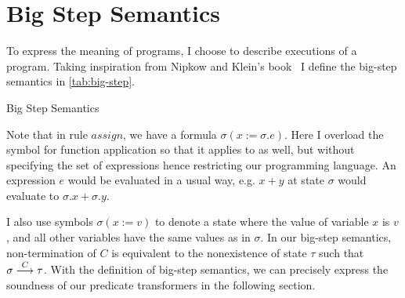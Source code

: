 \section{Big Step Semantics}\label{sec:big-step}
To express the meaning of programs, I choose  to describe executions of a program. 
Taking inspiration from Nipkow and Klein's book~\cite{nipkow2014} I define the big-step semantics in \autoref{tab:big-step}. 

\newcommand\ddfrac[2]{\frac{\displaystyle #1}{\displaystyle #2}}
\begin{table}[t]
  \normalsize
  \centering
  \caption{Big Step Semantics}
  \label{tab:big-step}
\end{table}

Note that in rule $assign$, we have a formula $\sigma(x:=\sigma.e)$. 
Here I overload the symbol for function application  so that it applies to  as well, but without specifying the set of expressions hence restricting our programming language. 
An expression $e$ would be evaluated in a usual way, e.g. $x+y$ at state $\sigma$ would evaluate to $\sigma.x + \sigma.y$. 

I also use symbols $\sigma(x:=v)$ to denote a state where the value of variable $x$ is $v$, and all other variables have the same values as in $\sigma$.
In our big-step semantics, non-termination of $C$ is equivalent to the nonexistence of state $\tau$ such that $\sigma\stackrel{C}{\longrightarrow}\tau$. 
With the definition of big-step semantics, we can precisely express the soundness of our predicate transformers in the following section. 


